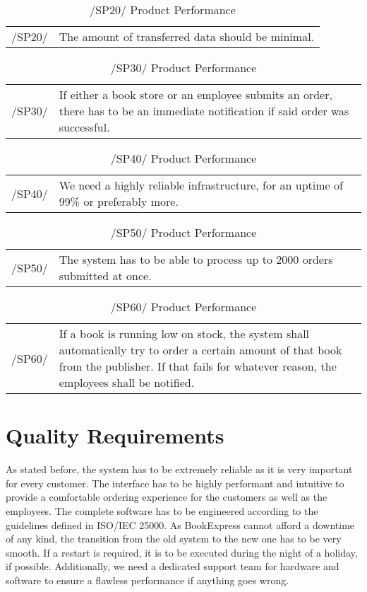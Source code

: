 \documentclass[11pt,a4paper,oneside,svgnames]{report}
\begin{document}
\begin{table}[H]
\centering
\begin{tabular}{p{1.5cm}p{11cm}}
\cellcolor{white}/SP20/ & The amount of transferred data should be minimal. \\
\end{tabular}
\caption{/SP20/ Product Performance}
\end{table}

\begin{table}[H]
\centering
\begin{tabular}{p{1.5cm}p{11cm}}
\cellcolor{white}/SP30/ & If either a book store or an employee submits an order, there has to be an immediate notification if said order was successful.\\
\end{tabular}
\caption{/SP30/ Product Performance}
\end{table}

\begin{table}[H]
\centering
\begin{tabular}{p{1.5cm}p{11cm}}
\cellcolor{white}/SP40/ & We need a highly reliable infrastructure, for an uptime of 99\% or preferably more. \\
\end{tabular}
\caption{/SP40/ Product Performance}
\end{table}

\begin{table}[H]
\centering
\begin{tabular}{p{1.5cm}p{11cm}}
\cellcolor{white}/SP50/ & The system has to be able to process up to 2000 orders submitted at once. \\
\end{tabular}
\caption{/SP50/ Product Performance}
\end{table}

\begin{table}[H]
\centering
\begin{tabular}{p{1.5cm}p{11cm}}
\cellcolor{white}/SP60/ & If a book is running low on stock, the system shall automatically try to order a certain amount of that book from the publisher.  If that fails for whatever reason, the employees shall be notified. \\
\end{tabular}
\caption{/SP60/ Product Performance}
\end{table}

\chapter{Quality Requirements}
As stated before, the system has to be extremely reliable as it is very important for every customer. The interface has to be highly performant and intuitive to provide a comfortable ordering experience for the customers as well as the employees. The complete software has to be engineered according to the guidelines defined in ISO/IEC 25000. As BookExpress cannot afford a downtime of any kind, the transition from the old system to the new one has to be very smooth. If a restart is required, it is to be executed during the night of a holiday, if possible. Additionally, we need a dedicated support team for hardware and software to ensure a flawless performance if anything goes wrong.
\end{document}
